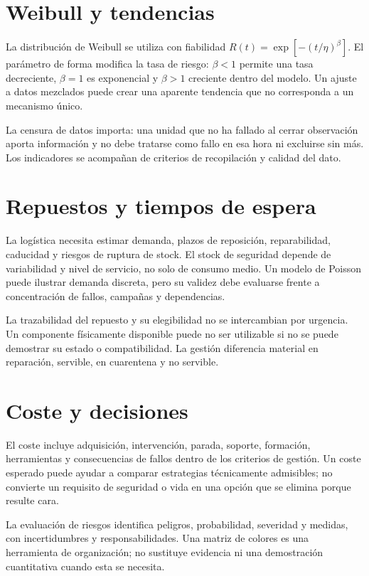 \section{Weibull y tendencias}
La distribución de Weibull se utiliza con fiabilidad $R(t)=\exp[-(t/\eta)^\beta]$. El parámetro de forma modifica la tasa de riesgo: $\beta<1$ permite una tasa decreciente, $\beta=1$ es exponencial y $\beta>1$ creciente dentro del modelo. Un ajuste a datos mezclados puede crear una aparente tendencia que no corresponda a un mecanismo único.

La censura de datos importa: una unidad que no ha fallado al cerrar observación aporta información y no debe tratarse como fallo en esa hora ni excluirse sin más. Los indicadores se acompañan de criterios de recopilación y calidad del dato.
\section{Repuestos y tiempos de espera}
La logística necesita estimar demanda, plazos de reposición, reparabilidad, caducidad y riesgos de ruptura de stock. El stock de seguridad depende de variabilidad y nivel de servicio, no solo de consumo medio. Un modelo de Poisson puede ilustrar demanda discreta, pero su validez debe evaluarse frente a concentración de fallos, campañas y dependencias.

La trazabilidad del repuesto y su elegibilidad no se intercambian por urgencia. Un componente físicamente disponible puede no ser utilizable si no se puede demostrar su estado o compatibilidad. La gestión diferencia material en reparación, servible, en cuarentena y no servible.
\section{Coste y decisiones}
El coste incluye adquisición, intervención, parada, soporte, formación, herramientas y consecuencias de fallos dentro de los criterios de gestión. Un coste esperado puede ayudar a comparar estrategias técnicamente admisibles; no convierte un requisito de seguridad o vida en una opción que se elimina porque resulte cara.

La evaluación de riesgos identifica peligros, probabilidad, severidad y medidas, con incertidumbres y responsabilidades. Una matriz de colores es una herramienta de organización; no sustituye evidencia ni una demostración cuantitativa cuando esta se necesita.
